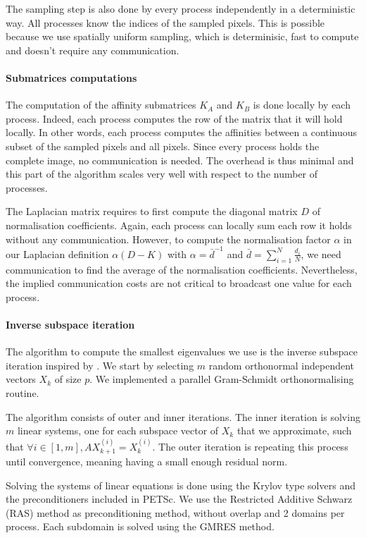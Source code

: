 The sampling step is also done by every process independently in a deterministic way.
All processes know the indices of the sampled pixels.
This is possible because we use spatially uniform sampling, which is determinisic, fast to compute and doesn't require any communication.

\paragraph{Submatrices computations}
The computation of the affinity submatrices \(K_A\) and \(K_B\) is done locally by each process.
Indeed, each process computes the row of the matrix that it will hold locally.
In other words, each process computes the affinities between a continuous subset of the sampled pixels and all pixels.
Since every process holds the complete image, no communication is needed.
The overhead is thus minimal and this part of the algorithm scales very well with respect to the number of processes.

The Laplacian matrix requires to first compute the diagonal matrix \(D\) of normalisation coefficients.
Again, each process can locally sum each row it holds without any communication.
However, to compute the normalisation factor \(\alpha\) in our Laplacian definition \(\alpha (D - K)\) with \(\alpha = \bar{d}^{-1}\) and \(\bar{d} = \sum^N_{i=1} \frac{d_i}{N}\), we need communication to find the average of the normalisation coefficients.
Nevertheless, the implied communication costs are not critical to broadcast one value for each process.

\paragraph{Inverse subspace iteration}
The algorithm to compute the smallest eigenvalues we use is the inverse subspace iteration inspired by \cite{el_khoury_acceleration_2014}.
We start by selecting \(m\) random orthonormal independent vectors \(X_k\) of size \(p\).
We implemented a parallel Gram-Schmidt orthonormalising routine.

The algorithm consists of outer and inner iterations.
The inner iteration is solving \(m\) linear systems, one for each subspace vector of \(X_k\) that we approximate, such that \(\forall i \in [1, m], A X_{k+1}^{(i)} = X_k^{(i)}\).
The outer iteration is repeating this process until convergence, meaning having a small enough residual norm.

Solving the systems of linear equations is done using the Krylov type solvers and the preconditioners included in PETSc.
We use the Restricted Additive Schwarz (RAS) method as preconditioning method, without overlap and 2 domains per process.
Each subdomain is solved using the GMRES method.

